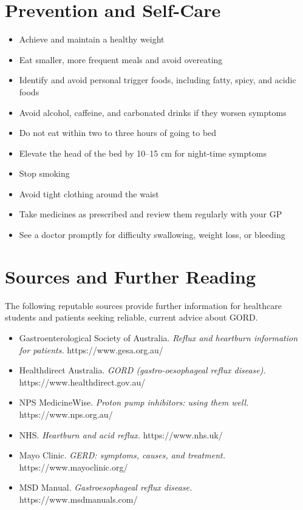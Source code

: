 \section*{Prevention and Self-Care}
\begin{itemize}
    \item Achieve and maintain a healthy weight
    \item Eat smaller, more frequent meals and avoid overeating
    \item Identify and avoid personal trigger foods, including fatty, spicy, and acidic foods
    \item Avoid alcohol, caffeine, and carbonated drinks if they worsen symptoms
    \item Do not eat within two to three hours of going to bed
    \item Elevate the head of the bed by 10--15 cm for night-time symptoms
    \item Stop smoking
    \item Avoid tight clothing around the waist
    \item Take medicines as prescribed and review them regularly with your GP
    \item See a doctor promptly for difficulty swallowing, weight loss, or bleeding
\end{itemize}

\section*{Sources and Further Reading}
The following reputable sources provide further information for healthcare students and patients seeking reliable, current advice about GORD.

\begin{itemize}
    \item Gastroenterological Society of Australia. \textit{Reflux and heartburn information for patients.} https://www.gesa.org.au/
    \item Healthdirect Australia. \textit{GORD (gastro-oesophageal reflux disease).} https://www.healthdirect.gov.au/
    \item NPS MedicineWise. \textit{Proton pump inhibitors: using them well.} https://www.nps.org.au/
    \item NHS. \textit{Heartburn and acid reflux.} https://www.nhs.uk/
    \item Mayo Clinic. \textit{GERD: symptoms, causes, and treatment.} https://www.mayoclinic.org/
    \item MSD Manual. \textit{Gastroesophageal reflux disease.} https://www.msdmanuals.com/
\end{itemize}
